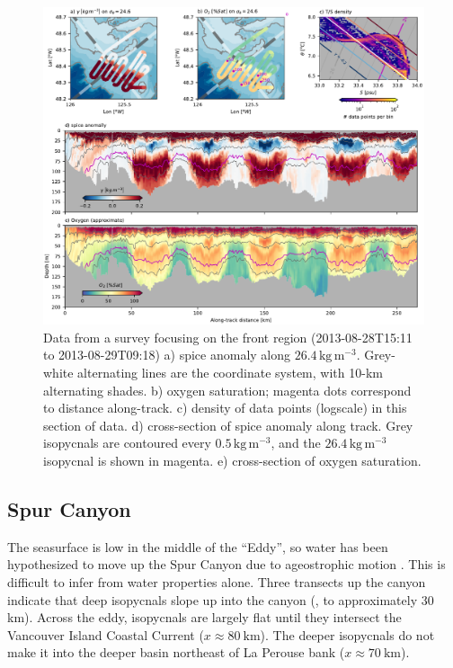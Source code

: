 \documentclass[draft]{agujournal2019}
\begin{document}
\begin{figure}[htbp]
  \begin{center}
    \includegraphics[width=6.2in]{Frontsurvey}
    \caption{Data from a survey focusing on the front region (2013-08-28T15:11 to 2013-08-29T09:18) a) spice anomaly along $26.4\,\mathrm{kg\,m^{-3}}$.  Grey-white alternating lines are the coordinate system, with 10-km alternating shades.   b) oxygen saturation; magenta dots correspond to distance along-track. c) density of data points (logscale) in this section of data.  d) cross-section of spice anomaly along track.  Grey isopycnals are contoured every $0.5\,\mathrm{kg\,m^{-3}}$, and the $26.4\,\mathrm{kg\,m^{-3}}$ isopycnal is shown in magenta.  e) cross-section of oxygen saturation.
      \label{fig:Frontsurvey} }
  \end{center}
\end{figure}

\subsection{Spur Canyon}

The seasurface is low in the middle of the ``Eddy'', so water has been hypothesized to move up the Spur Canyon due to ageostrophic motion \cite{weaverhsieh87,freelanddenman82}.  This is difficult to infer from water properties alone.  Three transects up the canyon indicate that deep isopycnals slope up into the canyon (, to approximately 30 km).  Across the eddy, isopycnals are largely flat until they intersect the Vancouver Island Coastal Current ($x\approx 80\ \mathrm{km}$).  The deeper isopycnals do not make it into the deeper basin northeast of La Perouse bank ($x\approx 70\ \mathrm{km}$).
\end{document}
